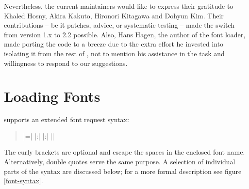 Nevertheless, the current maintainers would like to express their
gratitude to Khaled Hosny, Akira Kakuto, Hironori Kitagawa and Dohyun
Kim.
%
Their contributions -- be it patches, advice, or systematic
testing -- made the switch from version 1.x to 2.2 possible.
%
Also, Hans Hagen, the author of the font loader, made porting the
code to \LATEX a breeze due to the extra effort he invested into
isolating it from the rest of \CONTEXT, not to mention his assistance
in the task and willingness to respond to our suggestions.


\section{Loading Fonts}

 supports an extended font request syntax:

\begin{quote}
			|\font\foo={|%
			|:|%
			|:|%
			|}|%
\end{quote}

\noindent
The curly brackets are optional and escape the spaces in the enclosed
font name.
%
Alternatively, double quotes serve the same purpose.
%
A selection of individual parts of the syntax are discussed below;
for a more formal description see figure \ref{font-syntax}.

